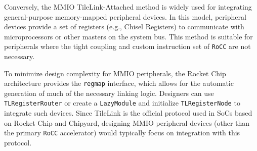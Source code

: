 Conversely, the MMIO TileLink-Attached method is widely used for integrating general-purpose memory-mapped peripheral devices. In this model, peripheral devices provide a set of registers (e.g., Chisel Registers) to communicate with microprocessors or other masters on the system bus. This method is suitable for peripherals where the tight coupling and custom instruction set of \texttt{RoCC} are not necessary.

To minimize design complexity for MMIO peripherals, the Rocket Chip architecture provides the \texttt{regmap} interface, which allows for the automatic generation of much of the necessary linking logic. Designers can use \texttt{TLRegisterRouter} or create a \texttt{LazyModule} and initialize \texttt{TLRegisterNode} to integrate such devices. Since TileLink is the official protocol used in SoCs based on Rocket Chip and Chipyard, designing MMIO peripheral devices (other than the primary \texttt{RoCC} accelerator) would typically focus on integration with this protocol.



